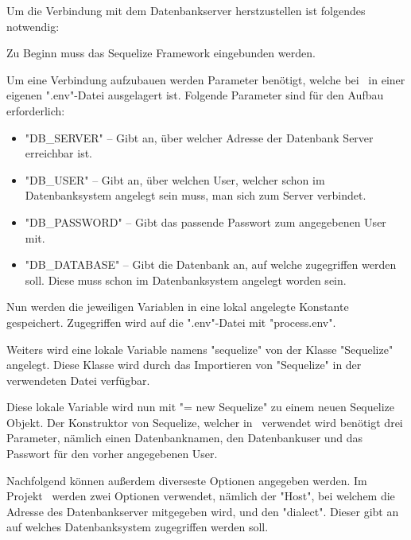 
Um die Verbindung mit dem Datenbankserver herstzustellen ist folgendes notwendig:

Zu Beginn muss das Sequelize Framework eingebunden werden.


Um eine Verbindung aufzubauen werden Parameter benötigt, welche bei \ZELIA\ in einer eigenen ".env"-Datei ausgelagert ist. Folgende Parameter sind für den Aufbau erforderlich:

\begin{itemize}
    \item "DB\_SERVER" -- Gibt an, über welcher Adresse der Datenbank Server erreichbar ist.
    \item "DB\_USER" -- Gibt an, über welchen User, welcher schon im Datenbanksystem angelegt sein muss, man sich zum Server verbindet.
    \item "DB\_PASSWORD" -- Gibt das passende Passwort zum angegebenen User mit.
    \item "DB\_DATABASE" -- Gibt die Datenbank an, auf welche zugegriffen werden soll. Diese muss schon im Datenbanksystem angelegt worden sein.
\end{itemize}

Nun werden die jeweiligen Variablen in eine lokal angelegte Konstante gespeichert. Zugegriffen wird auf die ".env"-Datei mit "{\ttfamily process.env}".


Weiters wird eine lokale Variable namens "sequelize" von der Klasse "Sequelize" angelegt. Diese Klasse wird durch das Importieren von "Sequelize" in der verwendeten Datei verfügbar.


Diese lokale Variable wird nun mit "{\ttfamily = new Sequelize}" zu einem neuen Sequelize Objekt. Der Konstruktor von Sequelize, welcher in \ZELIA\ verwendet wird benötigt drei Parameter, nämlich einen Datenbanknamen, den Datenbankuser und das Passwort für den vorher angegebenen User. 

Nachfolgend können außerdem diverseste Optionen angegeben werden. Im Projekt \ZELIA\ werden zwei Optionen verwendet, nämlich der "Host", bei welchem die Adresse des Datenbankserver mitgegeben wird, und den "dialect". Dieser gibt an auf welches Datenbanksystem zugegriffen werden soll.

